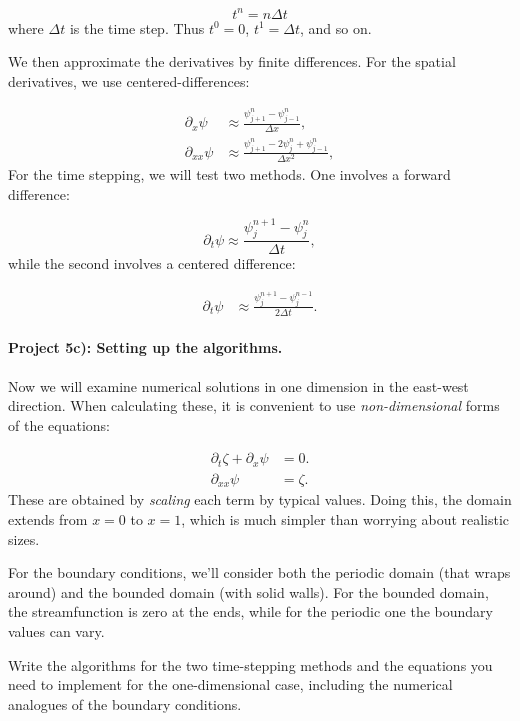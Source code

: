 \documentclass[%
oneside,                 %
final,                   %
10pt]{article}
\begin{document}
\begin{equation}
t^n = n\Delta t
\end{equation}
where $\Delta t$ is the time step. Thus $t^0=0$, $t^1=\Delta t$, and so on.

We then approximate the derivatives by finite differences. For
the spatial derivatives, we use centered-differences:

\begin{align}
	\partial_x\psi &\approx \frac{\psi_{j+1}^{n} - \psi_{j-1}^{n}}{\Delta x}, \\
	\partial_{xx}\psi &\approx \frac{\psi_{j+1}^{n} - 2\psi_{j}^{n} + \psi_{j-1}^{n}}{\Delta x^2},
\end{align}
For the time stepping, we will test two methods. One involves a
forward difference:

\begin{equation}
  \label{eq:Rossby3}
  \partial_t\psi \approx \frac{\psi_{j}^{n+1} - \psi_{j}^{n}}{\Delta t} ,
\end{equation}
while the second involves a centered difference:

\begin{align}
  \label{eq:Rossby4}
	\partial_t\psi &\approx \frac{\psi_{j}^{n+1} - \psi_{j}^{n-1}}{2\Delta t}.
\end{align}

\paragraph{Project 5c): Setting up the algorithms.}
Now we will examine 
numerical solutions in one dimension in the east-west
direction. When calculating these, it is convenient to use
\emph{non-dimensional} forms of the equations:

\begin{align}
	\partial_t\zeta + \partial_x\psi &= 0. \\
	\partial_{xx}\psi &= \zeta.
\end{align}
These are obtained by \emph{scaling} each term by typical values.
Doing this, the domain extends from $x=0$ to $x=1$, which is
much simpler than worrying about realistic sizes.

For the boundary conditions, we'll consider both the periodic
domain (that wraps around) and the bounded domain (with solid
walls). For the bounded domain, the streamfunction is zero at the
ends, while for the periodic one the boundary values can vary.

Write the algorithms for the two time-stepping methods and the
equations you need to implement for the one-dimensional case,
including the numerical analogues of the boundary conditions.
\end{document}

